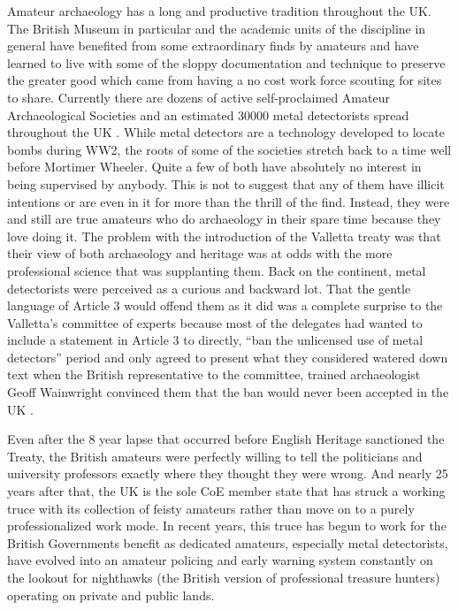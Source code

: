\documentclass[english]{ijsra}
\begin{document}
Amateur archaeology has a long and productive tradition throughout the UK. The British Museum in particular and the academic units of the discipline in general have benefited from some extraordinary finds by amateurs and have learned to live with some of the sloppy documentation and technique to preserve the greater good which came from having a no cost work force scouting for sites to share. Currently there are dozens of active self-proclaimed Amateur Archaeological Societies and an estimated \num{30000} metal detectorists spread throughout the UK \parencites{Roeher_2006}{Potts_2015}. 
While metal detectors are a technology developed to locate bombs during WW2, the roots of some of the societies stretch back to a time well before Mortimer Wheeler. Quite a few of both have absolutely no interest in being supervised by anybody. This is not to suggest that any of them have illicit intentions or are even in it for more than the thrill of the find. Instead, they were and still are true amateurs who do archaeology in their spare time because they love doing it. The problem with the introduction of the Valletta treaty was that their view of both archaeology and heritage was at odds with the more professional science that was supplanting them. Back on the continent, metal detectorists were perceived as a curious and backward lot. That the gentle language of Article 3 would offend them as it did was a complete surprise to the Valletta’s committee of experts because most of the delegates had wanted to include a statement in Article 3 to directly, “ban the unlicensed use of metal detectors” period and only agreed to present what they considered watered down text when the British representative to the committee, trained archaeologist Geoff Wainwright convinced them that the ban would never been accepted in the UK \parencite[62]{Willems_2007}. 

Even after the 8 year lapse that occurred before English Heritage sanctioned the Treaty, the British amateurs were perfectly willing to tell the politicians and university professors exactly where they thought they were wrong. And nearly 25 years after that, the UK is the sole CoE member state that has struck a working truce with its collection of feisty amateurs rather than move on to a purely professionalized work mode. In recent years, this truce has begun to work for the British Governments benefit as dedicated amateurs, especially metal detectorists, have evolved into an amateur policing and early warning system constantly on the lookout for nighthawks (the British version of professional treasure hunters) operating on private and public lands. 
\end{document}

